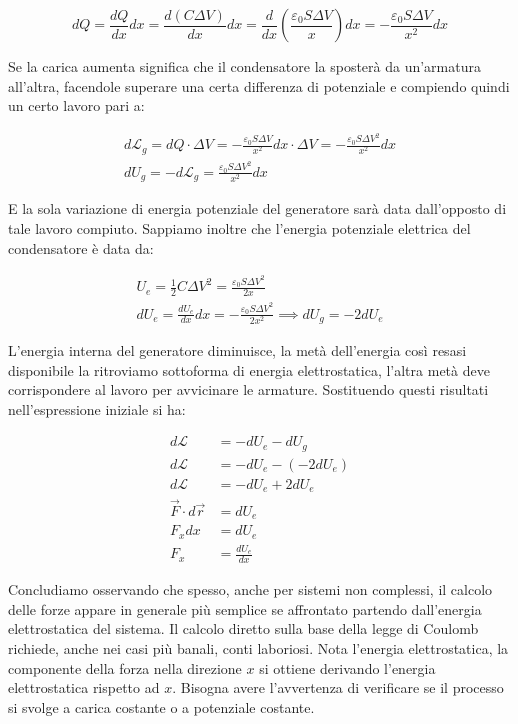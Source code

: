 \[
	dQ=\frac{dQ}{dx}dx = \frac{d(C\Delta V)}{dx} dx = \frac{d}{dx} \left( \frac{\varepsilon_0 S\Delta V}{x} \right) dx = - \frac{\varepsilon_0 S\Delta V}{x^2} dx
\]

Se la carica aumenta significa che il condensatore la sposterà da un'armatura all'altra, facendole superare una certa differenza di potenziale e compiendo quindi un certo lavoro pari a:

\begin{gather*}
	d\mathcal{L}_g=dQ\cdot \Delta V =-\frac{\varepsilon_0 S\Delta V}{x^2}dx \cdot \Delta V = - \frac{\varepsilon_0 S\Delta V^2}{x^2} dx \\
	dU_g = -d\mathcal{L}_g = \frac{\varepsilon_0 S\Delta V^2}{x^2}dx
\end{gather*}

E la sola variazione di energia potenziale del generatore sarà data dall'opposto di tale lavoro compiuto. Sappiamo inoltre che l'energia potenziale elettrica del condensatore è data da:

\begin{gather*}
	U_e = \frac{1}{2} C\Delta V^2 = \frac{\varepsilon_0 S \Delta V^2}{2x} \\
	dU_e = \frac{dU_e}{dx} dx= - \frac{\varepsilon_0 S \Delta V^2}{2 x^2} \implies dU_g = -2dU_e
\end{gather*}

L'energia interna del generatore diminuisce, la metà dell'energia così resasi disponibile la ritroviamo sottoforma di energia elettrostatica, l'altra metà deve corrispondere al lavoro per avvicinare le armature.
Sostituendo questi risultati nell'espressione iniziale si ha:

\begin{align*}
	d\mathcal{L} &= -dU_e - dU_g \\
	d\mathcal{L} &= -dU_e - (-2dU_e) \\
	d\mathcal{L} &= -dU_e + 2dU_e \\
	\vec{F} \cdot d\vec{r} &= dU_e \\
	F_xdx &= dU_e \\
	F_x &= \frac{dU_e}{dx}
\end{align*}

Concludiamo osservando che spesso, anche per sistemi non complessi, il calcolo delle forze appare in generale più semplice se affrontato partendo dall'energia elettrostatica del sistema. Il calcolo diretto sulla base della legge di Coulomb richiede, anche nei casi più banali, conti laboriosi. Nota l'energia elettrostatica, la componente della forza nella direzione $x$ si ottiene derivando l'energia elettrostatica rispetto ad $x$. Bisogna avere l'avvertenza di verificare se il processo si svolge a carica costante o a potenziale costante.

